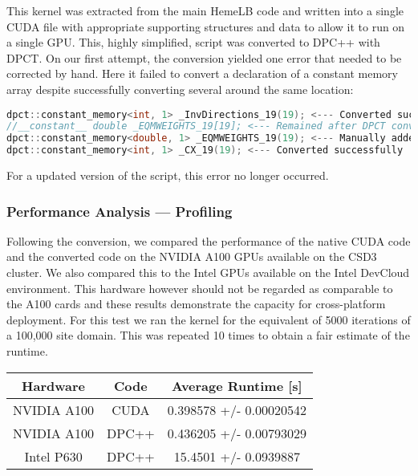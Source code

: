 This kernel was extracted from the main HemeLB code and written into a single CUDA file with appropriate supporting structures and data to allow it to run on a single GPU.
This, highly simplified, script was converted to DPC++ with DPCT.
On our first attempt, the conversion yielded one error that needed to be corrected by hand.
Here it failed to convert a declaration of a constant memory array despite successfully converting several around the same location:

\begin{lstlisting}[language=C++,basicstyle=\small]
dpct::constant_memory<int, 1> _InvDirections_19(19); <--- Converted successfully
//__constant__ double _EQMWEIGHTS_19[19]; <--- Remained after DPCT conversion
dpct::constant_memory<double, 1> _EQMWEIGHTS_19(19); <--- Manually added
dpct::constant_memory<int, 1> _CX_19(19); <--- Converted successfully
\end{lstlisting}

For a updated version of the script, this error no longer occurred.

\subsubsection{Performance Analysis --- Profiling}\label{sec:hemelb_performance}
Following the conversion, we compared the performance of the native CUDA code and the converted code on the NVIDIA A100 GPUs available on the CSD3 cluster.
We also compared this to the Intel GPUs available on the Intel DevCloud environment.
This hardware however should not be regarded as comparable to the A100 cards and these results demonstrate the capacity for cross-platform deployment.
For this test we ran the kernel for the equivalent of 5000 iterations of a 100,000 site domain.
This was repeated 10 times to obtain a fair estimate of the runtime.

\begin{center}
	\begin{tabular}{||c c c||}
		\hline
		Hardware    & Code  & Average Runtime [s]     \\ [0.5ex]
		\hline\hline
		NVIDIA A100 & CUDA  & 0.398578 +/- 0.00020542 \\
		\hline
		NVIDIA A100 & DPC++ & 0.436205 +/- 0.00793029 \\
		\hline
		Intel P630  & DPC++ & 15.4501 +/- 0.0939887   \\ [1ex]
		\hline
	\end{tabular}
\end{center}

